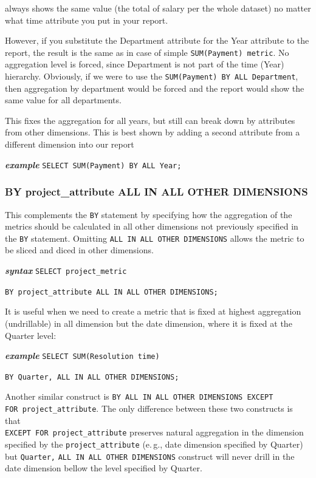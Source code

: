 \documentclass[a4paper, 12pt, titlepage, fleqn]{article}
\begin{document}
\noindent always shows the same value (the total of salary per the whole dataset) no matter what time attribute you put in your report.

However, if you substitute the Department attribute for the Year attribute to the report, the result is the same as in case of simple \verb=SUM(Payment) metric=. No aggregation level is forced, since Department is not part of the time (Year) hierarchy. Obviously, if we were to use the \verb=SUM(Payment) BY ALL Department=, then aggregation by department would be forced and the report would show the same value for all departments.

This fixes the aggregation for all years, but still can break down by attributes from other dimensions. This is best shown by adding a second attribute from a different dimension into our report

\textbf{\emph{example}}  \hspace{.9cm}\verb=SELECT SUM(Payment) BY ALL Year;=\\

\subsubsection{BY project\_attribute ALL IN ALL OTHER DIMENSIONS}
This complements the \verb=BY= statement by specifying how the aggregation of the metrics should be calculated in all other dimensions not previously specified in the \verb=BY= statement. Omitting \verb=ALL IN ALL OTHER DIMENSIONS= allows the metric to be sliced and diced in other dimensions.

\textbf{\emph{syntax}}  \hspace{.9cm}\verb=SELECT project_metric=

\hspace{2.2cm}\verb=BY project_attribute ALL IN ALL OTHER DIMENSIONS;=

It is useful when we need to create a metric that is fixed at highest aggregation (undrillable) in all dimension but the date dimension, where it is fixed at the Quarter level:

\textbf{\emph{example}}  \hspace{.9cm}\verb=SELECT SUM(Resolution time)=

\hspace{2.4cm}\verb=BY Quarter, ALL IN ALL OTHER DIMENSIONS;=

Another similar construct is \verb=BY ALL IN ALL OTHER DIMENSIONS EXCEPT=\\ \verb=FOR project_attribute=. The only difference between these two constructs is that\\ \verb=EXCEPT FOR project_attribute= preserves natural aggregation in the dimension specified by the \verb=project_attribute= (e.\,g., date dimension specified by Quarter) but \verb=Quarter,= \verb=ALL IN ALL OTHER DIMENSIONS= construct will never drill in the date dimension bellow the level specified by Quarter.
\end{document}
